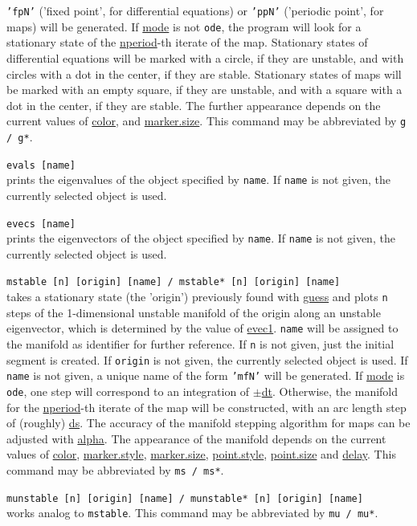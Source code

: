 \documentclass[10pt,a4paper,titlepage]{article}
\newcommand{\cmd}[2]{\item{\T{\hypertarget{#1}{#1}\index[index]{#1} #2}}}
\newcommand{\HL}[1]{\hyperlink{#1}{#1}}
\newcommand{\T}[1]{\texttt{#1}}
\begin{document}
\begin{description}
\T{'fpN'} ('fixed point', for differential equations) or \T{'ppN'} ('periodic point', for maps) will be generated. If \HL{mode} is not \T{ode}, the program will look for a stationary state of the \HL{nperiod}-th iterate of the map. Stationary states of differential equations will be marked with a circle, if they are unstable, and with circles with a dot in the center, if they are stable. Stationary states of maps will be marked with an empty square, if they are unstable, and with a square with a dot in the center, if they are stable. The further appearance depends on the current values of \HL{color}, and \HL{marker.size}. This command may be abbreviated by \T{g / g*}.
\cmd{evals}{[name]}\\
prints the eigenvalues of the object specified by \T{name}. If \T{name} is not given, the currently selected object is used.  
\cmd{evecs}{[name]}\\
prints the eigenvectors of the object specified by \T{name}. If \T{name} is not given, the currently selected object is used.  
\cmd{mstable}{[n] [origin] [name] / mstable* [n] [origin] [name]}\\takes a stationary state (the 'origin') previously found with \HL{guess} and plots \T{n} steps of the 1-dimensional unstable manifold of the origin along an unstable eigenvector, which is determined by the value of \HL{evec1}.  \T{name} will be assigned to the manifold as identifier for further reference. If \T{n} is not given, just the initial segment is created. If \T{origin} is not given, the currently selected object is used. If \T{name} is not given, a unique name of the form \T{'mfN'} will be generated. If \HL{mode} is \T{ode}, one step will correspond to an integration of $\pm$\HL{dt}. Otherwise, the manifold for the \HL{nperiod}-th iterate of the map will be constructed, with an arc length step of (roughly) \HL{ds}. The accuracy of the manifold stepping algorithm for maps can be adjusted with \HL{alpha}. The appearance of the manifold depends on the current values of \HL{color}, \HL{marker.style}, \HL{marker.size}, \HL{point.style}, \HL{point.size} and \HL{delay}. This command may be abbreviated by \T{ms / ms*}.
\cmd{munstable}{[n] [origin] [name] / munstable* [n] [origin] [name]}\\
works analog to \T{mstable}. This command may be abbreviated by \T{mu / mu*}.

\end{description}
\end{document}

